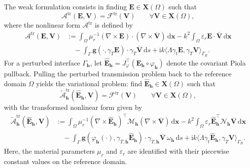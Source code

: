 \documentclass[12pt,reqno]{amsart}
\theoremstyle{definition}
\numberwithin{equation}{section}
\begin{document}
The weak formulation consists in finding $\mathbf{E} \in \mathbf{X}(\Omega)$ such that
\begin{equation}
\mathcal{A}^{\mathrm{tr}}(\mathbf{E}, \mathbf{V}) = \mathcal{F}^{\mathrm{tr}}(\mathbf{V}) \qquad \forall \mathbf{V} \in \mathbf{X}(\Omega),
\end{equation}
where the nonlinear form $\mathcal{A}^{\mathrm{tr}}$ is defined by
\begin{equation}
\begin{aligned}
\mathcal{A}^{\mathrm{tr}}(\mathbf{E}, \mathbf{V}) &:= \int_{\Omega} \mu_r^{-1} (\nabla \times \mathbf{E}) \cdot (\nabla \times \overline{\mathbf{V}}) \,\mathrm{d}\boldsymbol{x} - k^2 \int_{\Omega} \varepsilon_r \mathbf{E} \cdot \overline{\mathbf{V}} \,\mathrm{d}\boldsymbol{x} \\
&\quad - \int_{\Gamma} \mathbf{g}(\cdot, \gamma_T \mathbf{E}) \cdot \gamma_T \overline{\mathbf{V}} \,\mathrm{d}s + \mathrm{i}k \langle \Lambda \gamma_t \mathbf{E}, \gamma_T \mathbf{V} \rangle_{\Gamma_R}.
\end{aligned}
\end{equation}
For a perturbed interface $\Gamma_{\mathbf{h}}$, let $\hat{\mathbf{E}}_{\mathbf{h}} = J_\varphi^\top(\mathbf{E}_{\mathbf{h}} \circ \varphi_{\mathbf{h}})$ denote the covariant Piola pullback. Pulling the perturbed transmission problem back to the reference domain $\Omega$ yields the variational problem: find $\hat{\mathbf{E}}_{\mathbf{h}} \in \mathbf{X}(\Omega)$ such that
\begin{equation}
\widetilde{\mathcal{A}}^{\mathrm{tr}}_{\mathbf{h}}(\hat{\mathbf{E}}_{\mathbf{h}}, \mathbf{V}) = \mathcal{F}^{\mathrm{tr}}(\mathbf{V}) \qquad \forall \mathbf{V} \in \mathbf{X}(\Omega),
\end{equation}
with the transformed nonlinear form given by
\begin{equation}
\begin{aligned}
\widetilde{\mathcal{A}}^{\mathrm{tr}}_{\mathbf{h}}(\hat{\mathbf{E}}_{\mathbf{h}}, \mathbf{V}) &:= \int_{\Omega} \mu_r^{-1} (\nabla \times \hat{\mathbf{E}}_{\mathbf{h}})^\top \mathcal{M}_{\mathbf{h}} (\nabla \times \overline{\mathbf{V}}) \,\mathrm{d}\boldsymbol{x} - k^2 \int_{\Omega} \varepsilon_r \hat{\mathbf{E}}_{\mathbf{h}}^{\top} \mathcal{N}_{\mathbf{h}} \overline{\mathbf{V}} \,\mathrm{d}\boldsymbol{x} \\
&\quad - \int_{\Gamma} \mathbf{g}(\varphi_{\mathbf{h}}(\cdot), \gamma_{T,\mathbf{h}} \hat{\mathbf{E}}_{\mathbf{h}}) \cdot \gamma_{T,\mathbf{h}} \overline{\mathbf{V}} \, \omega_{\mathbf{h}} \,\mathrm{d}s + \mathrm{i}k \langle \Lambda \gamma_t \hat{\mathbf{E}}_{\mathbf{h}}, \gamma_T \mathbf{V} \rangle_{\Gamma_R}.
\end{aligned}
\end{equation}
Here, the material parameters $\mu_r$ and $\varepsilon_r$ are identified with their piecewise constant values on the reference domain. 
\end{document}
